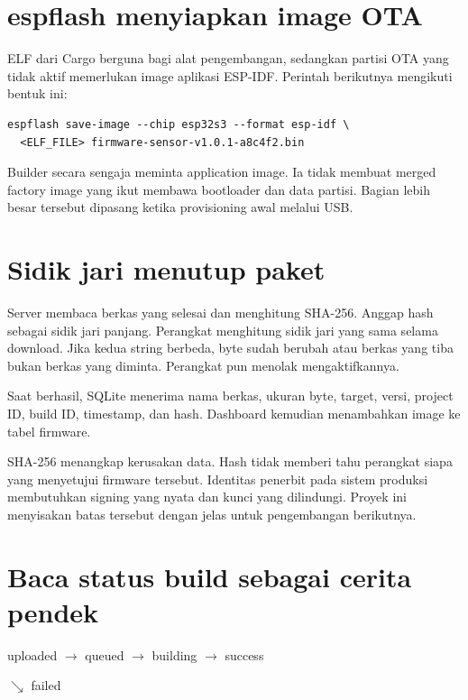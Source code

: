 \section{espflash menyiapkan image OTA}

ELF dari Cargo berguna bagi alat pengembangan, sedangkan partisi OTA yang tidak aktif memerlukan image aplikasi ESP-IDF. Perintah berikutnya mengikuti bentuk ini:

\begin{lstlisting}
espflash save-image --chip esp32s3 --format esp-idf \
  <ELF_FILE> firmware-sensor-v1.0.1-a8c4f2.bin
\end{lstlisting}

Builder secara sengaja meminta application image. Ia tidak membuat merged factory image yang ikut membawa bootloader dan data partisi. Bagian lebih besar tersebut dipasang ketika provisioning awal melalui USB.

\section{Sidik jari menutup paket}

Server membaca berkas  yang selesai dan menghitung SHA-256. Anggap hash sebagai sidik jari panjang. Perangkat menghitung sidik jari yang sama selama download. Jika kedua string berbeda, byte sudah berubah atau berkas yang tiba bukan berkas yang diminta. Perangkat pun menolak mengaktifkannya.

Saat berhasil, SQLite menerima nama berkas, ukuran byte, target, versi, project ID, build ID, timestamp, dan hash. Dashboard kemudian menambahkan image ke tabel firmware.

\begin{mentorbox}
SHA-256 menangkap kerusakan data. Hash tidak memberi tahu perangkat siapa yang menyetujui firmware tersebut. Identitas penerbit pada sistem produksi membutuhkan signing yang nyata dan kunci yang dilindungi. Proyek ini menyisakan batas tersebut dengan jelas untuk pengembangan berikutnya.
\end{mentorbox}

\section{Baca status build sebagai cerita pendek}

\begin{center}
\ttfamily uploaded $\rightarrow$ queued $\rightarrow$ building $\rightarrow$ success\par
\hspace*{7.4cm}$\searrow$ failed
\end{center}

